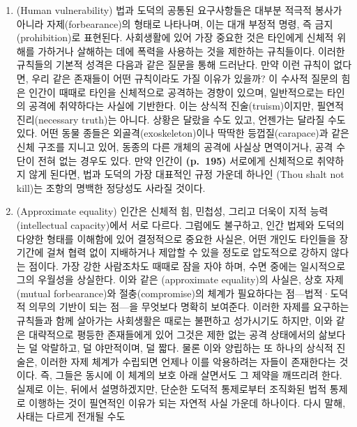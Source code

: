 \begin{enumerate}
\def\labelenumi{(\roman{enumi})}
\item
   (Human vulnerability) 법과 도덕의 공통된
  요구사항들은 대부분 적극적 봉사가 아니라 자제(forbearance)의 형태로
  나타나며, 이는 대개 부정적 명령, 즉 금지(prohibition)로 표현된다.
  사회생활에 있어 가장 중요한 것은 타인에게 신체적 위해를 가하거나
  살해하는 데에 폭력을 사용하는 것을 제한하는 규칙들이다. 이러한
  규칙들의 기본적 성격은 다음과 같은 질문을 통해 드러난다. 만약 이런
  규칙이 없다면, 우리 같은 존재들이  어떤 규칙이라도
  가질 이유가 있을까? 이 수사적 질문의 힘은 인간이 때때로 타인을
  신체적으로 공격하는 경향이 있으며, 일반적으로는 타인의 공격에
  취약하다는 사실에 기반한다. 이는 상식적 진술(truism)이지만, 필연적
  진리(necessary truth)는 아니다. 상황은 달랐을 수도 있고, 언젠가는
  달라질 수도 있다. 어떤 동물 종들은 외골격(exoskeleton)이나 딱딱한
  등껍질(carapace)과 같은 신체 구조를 지니고 있어, 동종의 다른 개체의
  공격에 사실상 면역이거나, 공격 수단이 전혀 없는 경우도 있다. 만약
  인간이 \textbf{(p.~195)} 서로에게 신체적으로 취약하지 않게 된다면,
  법과 도덕의 가장 대표적인 규정 가운데 하나인 (Thou
  shalt not kill)는 조항의 명백한 정당성도 사라질 것이다.
\item
   (Approximate equality) 인간은 신체적 힘, 민첩성,
  그리고 더욱이 지적 능력(intellectual capacity)에서 서로 다르다.
  그럼에도 불구하고, 인간 법제와 도덕의 다양한 형태를 이해함에 있어
  결정적으로 중요한 사실은, 어떤 개인도 타인들을 장기간에 걸쳐 협력 없이
  지배하거나 제압할 수 있을 정도로 압도적으로 강하지 않다는 점이다. 가장
  강한 사람조차도 때때로 잠을 자야 하며, 수면 중에는 일시적으로 그의
  우월성을 상실한다. 이와 같은 (approximate
  equality)의 사실은, 상호 자제(mutual forbearance)와 절충(compromise)의
  체계가 필요하다는 점---법적·도덕적 의무의 기반이 되는 점---을 무엇보다
  명확히 보여준다. 이러한 자제를 요구하는 규칙들과 함께 살아가는
  사회생활은 때로는 불편하고 성가시기도 하지만, 이와 같은 대략적으로
  평등한 존재들에게 있어 그것은 제한 없는 공격 상태에서의 삶보다는 덜
  악랄하고, 덜 야만적이며, 덜 짧다. 물론 이와 양립하는 또 하나의 상식적
  진술은, 이러한 자제 체계가 수립되면 언제나 이를 악용하려는 자들이
  존재한다는 것이다. 즉, 그들은 동시에 이 체계의 보호 아래 살면서도 그
  제약을 깨뜨리려 한다. 실제로 이는, 뒤에서 설명하겠지만, 단순한 도덕적
  통제로부터 조직화된 법적 통제로 이행하는 것이 필연적인 이유가 되는
  자연적 사실 가운데 하나이다. 다시 말해, 사태는 다르게 전개될 수도

\end{enumerate}
